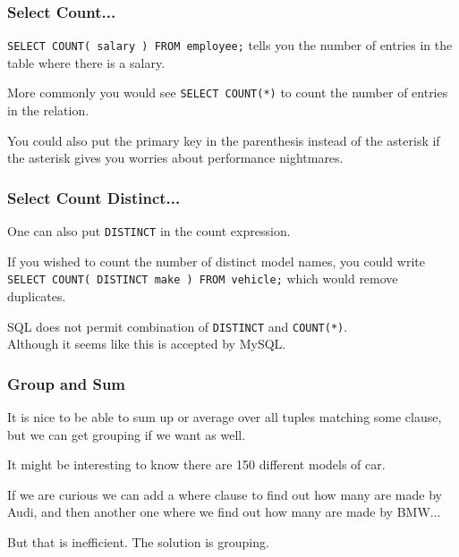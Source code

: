 \begin{frame}
\frametitle{Select Count...}

\texttt{SELECT COUNT( salary ) FROM employee;} tells you the number of entries in the table where there is a salary. 

More commonly you would see \texttt{SELECT COUNT(*)} to count the number of entries in the relation.

You could also put the primary key in the parenthesis instead of the asterisk if the asterisk gives you worries about performance nightmares.


\end{frame}



\begin{frame}
\frametitle{Select Count Distinct...}

One can also put \texttt{DISTINCT} in the count expression. 

If you wished to count the number of distinct model names, you could write \texttt{SELECT COUNT( DISTINCT make ) FROM vehicle;} which would remove duplicates.

SQL does not permit combination of \texttt{DISTINCT} and \texttt{COUNT(*)}.\\ \quad Although it seems like this is accepted by MySQL.

\end{frame}



\begin{frame}
\frametitle{Group and Sum}

It is nice to be able to sum up or average over all tuples matching some clause, but we can get grouping if we want as well. 

It might be interesting to know there are 150 different models of car. 

If we are curious we can add a where clause to find out how many are made by Audi, and then another one where we find out how many are made by BMW... 

But that is inefficient. The solution is grouping.


\end{frame}



